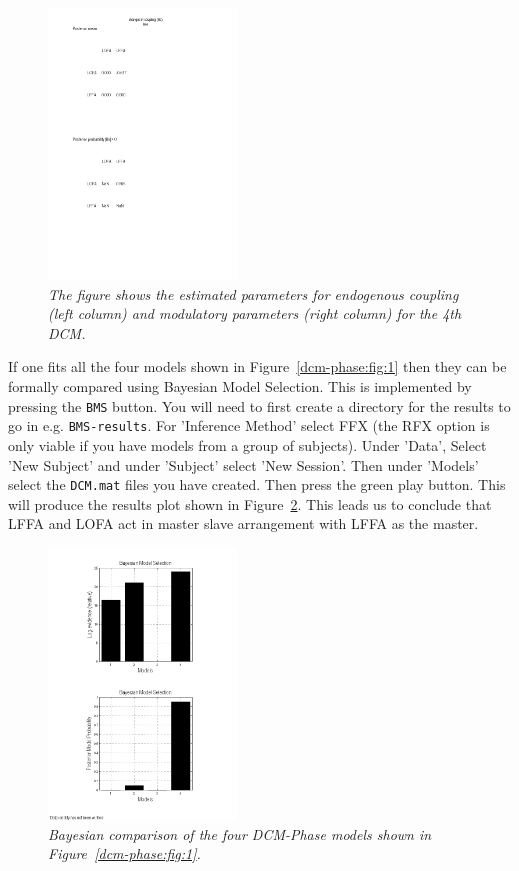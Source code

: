 \begin{figure}
\begin{center}
\includegraphics[width=50mm]{multimodal/figures/modulatory}
\caption{\em The figure shows the estimated parameters for endogenous coupling (left column) and modulatory parameters (right column) for the 4th DCM.  \label{dcm-phase:fig:3}}
\end{center}
\end{figure}

If one fits all the four models shown in Figure~\ref{dcm-phase:fig:1} then they can be formally compared using Bayesian Model Selection. This is implemented by pressing the \texttt{BMS} button. You will need to first create a directory for the results to go in e.g. \texttt{BMS-results}. For 'Inference Method' select FFX (the RFX option is only viable if you have models from a group of subjects). Under 'Data', Select 'New Subject' and under 'Subject' select 'New Session'. Then under 'Models' select the \texttt{DCM.mat} files you have created.  Then press the green play button. This will produce the results plot shown in Figure~\ref{dcm-phase:fig:4}. This leads us to conclude that 
LFFA and LOFA act in master slave arrangement with LFFA as the master.

\begin{figure}
\begin{center}
\includegraphics[width=50mm]{multimodal/figures/bms-phase}
\caption{\em Bayesian comparison of the four DCM-Phase models shown in Figure~\ref{dcm-phase:fig:1}.\label{dcm-phase:fig:4}}
\end{center}
\end{figure}

